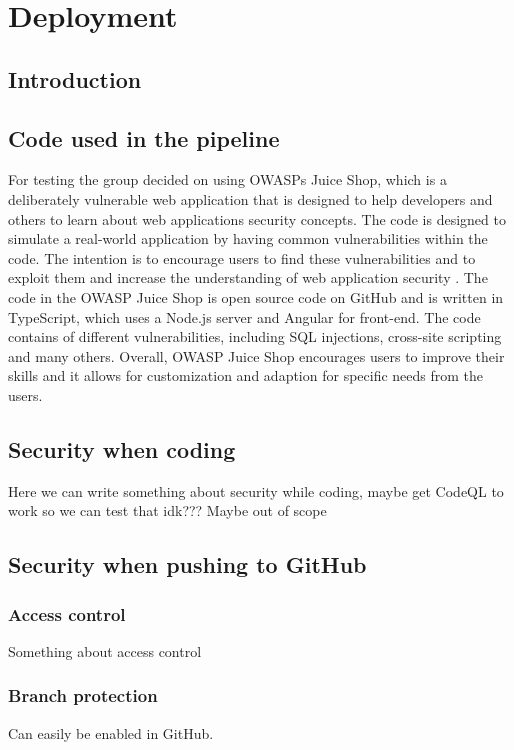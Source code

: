 \chapter{Deployment}
\section{Introduction}
\section{Code used in the pipeline}
For testing the group decided on using OWASPs Juice Shop, which is a deliberately vulnerable web application that is designed to help developers and others to learn about web applications security concepts. The code is designed to simulate a real-world application by having common vulnerabilities within the code. The intention is to encourage users to find these vulnerabilities and to exploit them and increase the understanding of web application security \cite{owaspJuiceShop}.
The code in the OWASP Juice Shop is open source code on GitHub and is written in TypeScript, which uses a Node.js server and Angular for front-end. \cite{owaspJuiceShopCode}
The code contains of different vulnerabilities, including SQL injections, cross-site scripting and many others. 
Overall, OWASP Juice Shop encourages users to improve their skills and it allows for customization and adaption for specific needs from the users. 


\section{Security when coding}
Here we can write something about security while coding, maybe get CodeQL to work so we can test that idk??? Maybe out of scope

\section{Security when pushing to GitHub}

\subsection{Access control}
Something about access control

\subsection{Branch protection}
Can easily be enabled in GitHub. 


